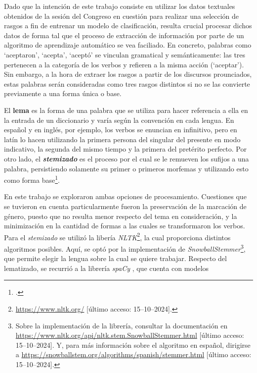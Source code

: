 Dado que la intenci\'on de este trabajo consiste en utilizar los datos textuales
obtenidos de la sesi\'on del Congreso en cuesti\'on para realizar una selecci\'on
de rasgos a fin de entrenar un modelo de clasificaci\'on, resulta crucial procesar dichos
datos de forma tal que el proceso de extracci\'on de informaci\'on por parte
de un algoritmo de aprendizaje autom\'atico se vea faciliado. En concreto, palabras
como `aceptaron', `acepta', `acept\'o' se vinculan gramatical y sem\'anticamente:
las tres pertenecen a la categor\'ia de los verbos y refieren a la misma acci\'on (`aceptar').
Sin embargo, a la hora de extraer los rasgos a partir de los discursos prounciados,
estas palabras ser\'an consideradas como tres rasgos distintos si no se las convierte
previamente a una forma \'unica o base.
\par
El \textbf{lema} es la forma de una palabra que se utiliza para hacer referencia a ella
en la entrada de un diccionario y var\'ia seg\'un la convenci\'on en cada lengua. En español
y en ingl\'es, por ejemplo, los verbos se enuncian en infinitivo, pero en lat\'in lo hacen
utilizando la primera persona del singular del presente en modo indicativo, la segunda
del mismo tiempo y la primera del pret\'erito perfecto. Por otro lado, el
\textbf{\textit{stemizado}} es el proceso por el cual se le remueven los sufijos
a una palabra, persistiendo solamente su primer o primeros morfemas y utilizando
esto como forma base\footnote{\citet[Cap\'itulo~3]{bird2009natural}.}.
\par
En este trabajo se exploraron ambas opciones de procesamiento. Cuestiones que se tuvieron
en cuenta particularmente fueron la preservaci\'on de la marcaci\'on de g\'enero, puesto que
no resulta menor respecto del tema en consideraci\'on, y la minimizaci\'on en la cantidad de formas a las
cuales se transformaron los verbos. Para el \textit{stemizado} se utiliz\'o la
liber\'ia \textit{NLTK}\footnote{\url{https://www.nltk.org/} [\'ultimo acceso: 15--10--2024].},
la cual proporciona distintos algoritmos posibles. Aqu\'i, se opt\'o por la
implementaci\'on de \textit{SnowballStemmer}\footnote{Sobre la implementaci\'on de la
librer\'ia, consultar la documentaci\'on en
\url{https://www.nltk.org/api/nltk.stem.SnowballStemmer.html}
[\'ultimo acceso: 15--10--2024]. Y, para m\'as informaci\'on
sobre el algoritmo en español, dirigirse a
\url{https://snowballstem.org/algorithms/spanish/stemmer.html}
[\'ultimo acceso: 15--10--2024].}, que permite elegir
la lengua sobre la cual se quiere trabajar. Respecto del lematizado, se recurri\'o
a la librer\'ia \textit{spaCy} \citep{honnibal2020spacy}, que cuenta con modelos
